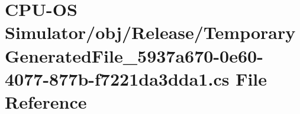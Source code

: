 \hypertarget{_c_p_u-_o_s_01_simulator_2obj_2_release_2_temporary_generated_file__5937a670-0e60-4077-877b-f7221da3dda1_8cs}{}\section{C\+P\+U-\/\+O\+S Simulator/obj/\+Release/\+Temporary\+Generated\+File\+\_\+5937a670-\/0e60-\/4077-\/877b-\/f7221da3dda1.cs File Reference}
\label{_c_p_u-_o_s_01_simulator_2obj_2_release_2_temporary_generated_file__5937a670-0e60-4077-877b-f7221da3dda1_8cs}
